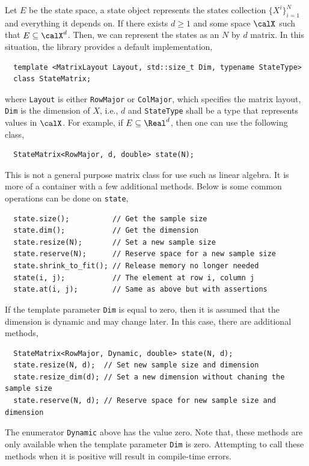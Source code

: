 Let $E$ be the state space, a state object represents the states collection
$\{X^i\}_{i=1}^N$ and everything it depends on. If there exists $d\ge1$ and
some space $\calX$ such that $E\subseteq\calX^d$. Then, we can represent the
states as an $N$ by $d$ matrix. In this situation, the library provides a
default implementation,
\begin{Verbatim}
  template <MatrixLayout Layout, std::size_t Dim, typename StateType>
  class StateMatrix;
\end{Verbatim}
where \verb|Layout| is either \verb|RowMajor| or \verb|ColMajor|, which
specifies the matrix layout, \verb|Dim| is the dimension of $X$, i.e., $d$ and
\verb|StateType| shall be a \cpp type that represents values in $\calX$. For
example, if $E\subseteq\Real^d$, then one can use the following class,
\begin{Verbatim}
  StateMatrix<RowMajor, d, double> state(N);
\end{Verbatim}
This is not a general purpose matrix class for use such as linear algebra. It
is more of a container with a few additional methods. Below is some common
operations can be done on \verb|state|,
\begin{Verbatim}
  state.size();          // Get the sample size
  state.dim();           // Get the dimension
  state.resize(N);       // Set a new sample size
  state.reserve(N);      // Reserve space for a new sample size
  state.shrink_to_fit(); // Release memory no longer needed
  state(i, j);           // The element at row i, column j
  state.at(i, j);        // Same as above but with assertions
\end{Verbatim}
If the template parameter \verb|Dim| is equal to zero, then it is assumed that
the dimension is dynamic and may change later. In this case, there are
additional methods,
\begin{Verbatim}
  StateMatrix<RowMajor, Dynamic, double> state(N, d);
  state.resize(N, d);  // Set new sample size and dimension
  state.resize_dim(d); // Set a new dimension without chaning the sample size
  state.reserve(N, d); // Reserve space for new sample size and dimension
\end{Verbatim}
The enumerator \verb|Dynamic| above has the value zero. Note that, these
methods are only available when the template parameter \verb|Dim| is zero.
Attempting to call these methods when it is positive will result in
compile-time errors.

